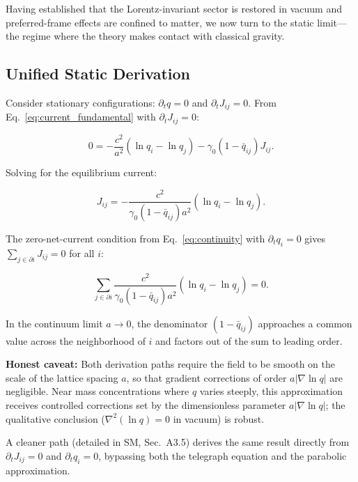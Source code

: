 \documentclass[aps,prd,twocolumn,showpacs,superscriptaddress,preprintnumbers]{revtex4-2}
\begin{document}
Having established that the Lorentz-invariant sector is restored in vacuum and preferred-frame effects are confined to matter, we now turn to the static limit---the regime where the theory makes contact with classical gravity.

\subsection{Unified Static Derivation}

Consider stationary configurations: $\partial_t q=0$ and $\partial_t J_{ij}=0$.
From Eq.~\eqref{eq:current_fundamental} with $\partial_t J_{ij}=0$:

\begin{equation}
0 = -\frac{c^2}{a^2}(\ln q_i - \ln q_j) - \gamma_0(1-\bar{q}_{ij})J_{ij}.
\label{eq:static_J_eq}
\end{equation}

Solving for the equilibrium current:

\begin{equation}
J_{ij} = -\frac{c^2}{\gamma_0(1-\bar{q}_{ij})a^2}(\ln q_i - \ln q_j).
\label{eq:J_static}
\end{equation}

The zero-net-current condition from Eq.~\eqref{eq:continuity} with $\partial_t q_i=0$ gives $\sum_{j\in\partial i}J_{ij}=0$ for all $i$:

\begin{equation}
\sum_{j\in\partial i} \frac{c^2}{\gamma_0(1-\bar{q}_{ij})a^2}(\ln q_i - \ln q_j) = 0.
\label{eq:zero_net_current}
\end{equation}

In the continuum limit $a\to0$, the denominator $(1-\bar{q}_{ij})$ approaches a common value across the neighborhood of $i$ and factors out of the sum to leading order.

\textbf{Honest caveat:} Both derivation paths require the field to be smooth on the scale of the lattice spacing $a$, so that gradient corrections of order $a|\nabla\ln q|$ are negligible. Near mass concentrations where $q$ varies steeply, this approximation receives controlled corrections set by the dimensionless parameter $a|\nabla\ln q|$; the qualitative conclusion ($\nabla^2(\ln q)=0$ in vacuum) is robust.

A cleaner path (detailed in SM, Sec.~A3.5) derives the same result directly from $\partial_t J_{ij}=0$ and $\partial_t q_i=0$, bypassing both the telegraph equation and the parabolic approximation.
\end{document}
